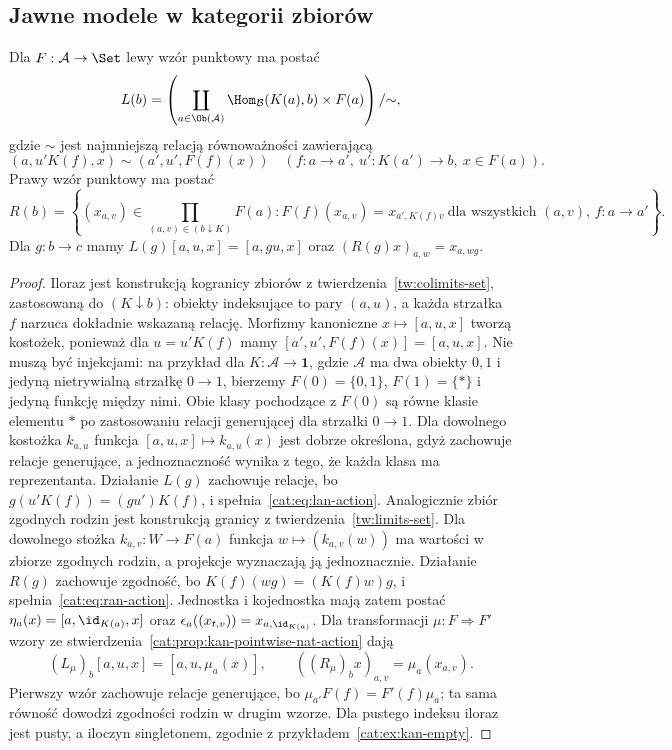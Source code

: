\subsection{Jawne modele w kategorii zbiorów}
\begin{twierdzenie}\label{cat:thm:kan-set}
Dla $F:\mathcal A\to\Set$ lewy wzór punktowy ma postać
\[
 L(b)=\left(\coprod_{a\in\Ob(\mathcal A)}
       \Hom_{\mathcal B}(K(a),b)\times F(a)\right)/{\sim},
\]
gdzie $\sim$ jest najmniejszą relacją równoważności zawierającą
\[
 (a,u'K(f),x)\sim(a',u',F(f)(x))
 \quad(f:a\to a',\ u':K(a')\to b,\ x\in F(a)).
\]
Prawy wzór punktowy ma postać
\[
 R(b)=\left\{(x_{a,v})\in\prod_{(a,v)\in(b\downarrow K)}F(a):
 F(f)(x_{a,v})=x_{a',K(f)v}\ \text{dla wszystkich }(a,v),\,f:a\to a'\right\}.
\]
Dla $g:b\to c$ mamy $L(g)[a,u,x]=[a,gu,x]$ oraz
$(R(g)x)_{a,w}=x_{a,wg}$.
\end{twierdzenie}
\begin{proof}
Iloraz jest konstrukcją kogranicy zbiorów z twierdzenia~\ref{tw:colimits-set}, zastosowaną do $(K\downarrow b)$: obiekty indeksujące to pary $(a,u)$, a każda strzałka $f$ narzuca dokładnie wskazaną relację. Morfizmy kanoniczne $x\mapsto[a,u,x]$ tworzą kostożek, ponieważ dla $u=u'K(f)$ mamy $[a',u',F(f)(x)]=[a,u,x]$. Nie muszą być injekcjami: na przykład dla $K:\mathcal A\to\mathbf1$, gdzie $\mathcal A$ ma dwa obiekty $0,1$ i jedyną nietrywialną strzałkę $0\to1$, bierzemy $F(0)=\{0,1\}$, $F(1)=\{*\}$ i jedyną funkcję między nimi. Obie klasy pochodzące z $F(0)$ są równe klasie elementu $*$ po zastosowaniu relacji generującej dla strzałki $0\to1$. Dla dowolnego kostożka $k_{a,u}$ funkcja $[a,u,x]\mapsto k_{a,u}(x)$ jest dobrze określona, gdyż zachowuje relacje generujące, a jednoznaczność wynika z tego, że każda klasa ma reprezentanta. Działanie $L(g)$ zachowuje relacje, bo $g(u'K(f))=(gu')K(f)$, i spełnia~\eqref{cat:eq:lan-action}. Analogicznie zbiór zgodnych rodzin jest konstrukcją granicy z twierdzenia~\ref{tw:limits-set}. Dla dowolnego stożka $k_{a,v}:W\to F(a)$ funkcja $w\mapsto(k_{a,v}(w))$ ma wartości w zbiorze zgodnych rodzin, a projekcje wyznaczają ją jednoznacznie. Działanie $R(g)$ zachowuje zgodność, bo $K(f)(wg)=(K(f)w)g$, i spełnia~\eqref{cat:eq:ran-action}. Jednostka i kojednostka mają zatem postać $\eta_a(x)=[a,\id_{K(a)},x]$ oraz $\epsilon_a((x_{t,v}))=x_{a,\id_{K(a)}}$. Dla transformacji $\mu:F\Rightarrow F'$ wzory ze stwierdzenia~\ref{cat:prop:kan-pointwise-nat-action} dają
\[
 (L_\mu)_b[a,u,x]=[a,u,\mu_a(x)],\qquad
 ((R_\mu)_b x)_{a,v}=\mu_a(x_{a,v}).
\]
Pierwszy wzór zachowuje relacje generujące, bo $\mu_{a'}F(f)=F'(f)\mu_a$; ta sama równość dowodzi zgodności rodzin w drugim wzorze. Dla pustego indeksu iloraz jest pusty, a iloczyn singletonem, zgodnie z przykładem~\ref{cat:ex:kan-empty}.
\end{proof}
